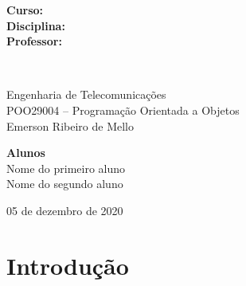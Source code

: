 \documentclass[11pt]{../../classes/ifscarticle}
\begin{document}
\begin{titlepage}
\begin{minipage}{.9\linewidth}

\begin{minipage}{0.15\textwidth}
\begin{flushleft} \large
\textbf{Curso:}\\
\textbf{Disciplina:}\\
\textbf{Professor:}
\end{flushleft}
\end{minipage}~
\begin{minipage}{0.8\textwidth}
\begin{flushleft} \large
Engenharia de Telecomunicações\\
POO29004 -- Programação Orientada a Objetos\\
Emerson Ribeiro de Mello
\end{flushleft}
\end{minipage}
\end{minipage}
\vspace{3cm}

\begin{minipage}{.9\linewidth}
\begin{flushright}
\textbf{Alunos}\\
Nome do primeiro aluno\\
Nome do segundo aluno
\end{flushright}
\end{minipage}
\vfill


\begin{center}
05 de dezembro de 2020
\end{center}

\end{titlepage}
\pagestyle{firstpage}



\section{Introdução}
\label{sec:introducao}
\end{document}
